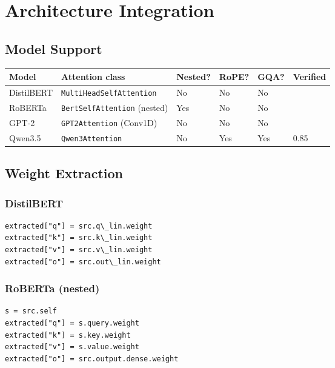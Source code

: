 
\section{Architecture Integration}

\subsection{Model Support}

\begin{table}[H]
\centering
\small
\begin{tabular}{llllll}
\toprule
\textbf{Model} & \textbf{Attention class} & \textbf{Nested?} & \textbf{RoPE?} & \textbf{GQA?} & \textbf{Verified} \\
\midrule
DistilBERT & \texttt{MultiHeadSelfAttention} & No & No & No &  \\
RoBERTa & \texttt{BertSelfAttention} (nested) & Yes & No & No &  \\
GPT-2 & \texttt{GPT2Attention} (Conv1D) & No & No & No &  \\
Qwen3.5 & \texttt{Qwen3Attention} & No & Yes & Yes & 0.85 \\
\bottomrule
\end{tabular}
\end{table}

\subsection{Weight Extraction}

\subsubsection{DistilBERT}

\begin{lstlisting}
extracted["q"] = src.q\_lin.weight
extracted["k"] = src.k\_lin.weight
extracted["v"] = src.v\_lin.weight
extracted["o"] = src.out\_lin.weight
\end{lstlisting}

\subsubsection{RoBERTa (nested)}

\begin{lstlisting}
s = src.self
extracted["q"] = s.query.weight
extracted["k"] = s.key.weight
extracted["v"] = s.value.weight
extracted["o"] = src.output.dense.weight
\end{lstlisting}

